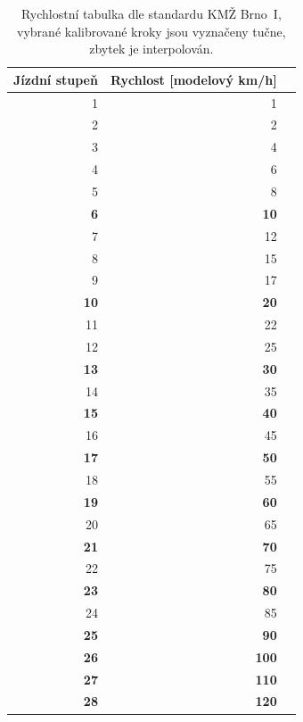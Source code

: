 \begin{table}[h]
	\begin{tabularx}{0.66\textwidth}{rrX}
		\toprule
		Jízdní stupeň & Rychlost [modelový km/h] \\
		\midrule
		1 & 1 \\
		2 & 2 \\
		3 & 4 \\
		4 & 6 \\
		5 & 8 \\
		\textbf{6} & \textbf{10} \\
		7 & 12 \\
		8 & 15 \\
		9 & 17 \\
		\textbf{10} & \textbf{20} \\
		11 & 22 \\
		12 & 25 \\
		\textbf{13} & \textbf{30} \\
		14 & 35 \\
		\textbf{15} & \textbf{40} \\
		16 & 45 \\
		\textbf{17} & \textbf{50} \\
		18 & 55 \\
		\textbf{19} & \textbf{60} \\
		20 & 65 \\
		\textbf{21} & \textbf{70} \\
		22 & 75 \\
		\textbf{23} & \textbf{80} \\
		24 & 85 \\
		\textbf{25} & \textbf{90} \\
		\textbf{26} & \textbf{100} \\
		\textbf{27} & \textbf{110} \\
		\textbf{28} & \textbf{120} \\
		\bottomrule
	\end{tabularx}
	\caption{Rychlostní tabulka dle standardu KMŽ Brno~I, vybrané kalibrované
	kroky jsou vyznačeny tučne, zbytek je interpolován.}
	\label{fig:step-to-speed}
\end{table}
